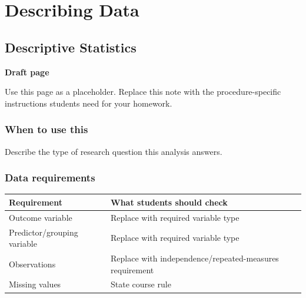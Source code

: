 \documentclass[
  letterpaper,
  DIV=11,
  numbers=noendperiod]{scrreprt}
\newcounter{none} %
\begin{document}
\part{Describing Data}

\chapter{Descriptive Statistics}\label{descriptive-statistics}

\begin{tcolorbox}[enhanced jigsaw, arc=.35mm, bottomrule=.15mm, breakable, colback=white, colframe=quarto-callout-note-color-frame, left=2mm, leftrule=.75mm, opacityback=0, rightrule=.15mm, toprule=.15mm]
\begin{minipage}[t]{5.5mm}
\textcolor{quarto-callout-note-color}{\faInfo}
\end{minipage}%
\begin{minipage}[t]{\textwidth - 5.5mm}

\vspace{-3mm}\textbf{Draft page}\vspace{3mm}

Use this page as a placeholder. Replace this note with the
procedure-specific instructions students need for your homework.

\end{minipage}%
\end{tcolorbox}

\section{When to use this}\label{when-to-use-this-3}

Describe the type of research question this analysis answers.

\section{Data requirements}\label{data-requirements-3}

{\def\LTcaptype{none} %
\begin{longtable}[]{@{}
  >{\raggedright\arraybackslash}p{}
  >{\raggedright\arraybackslash}p{}@{}}
\toprule\noalign{}
\begin{minipage}[b]{\linewidth}\raggedright
Requirement
\end{minipage} & \begin{minipage}[b]{\linewidth}\raggedright
What students should check
\end{minipage} \\
\midrule\noalign{}
\endhead
\bottomrule\noalign{}
\endlastfoot
Outcome variable & Replace with required variable type \\
Predictor/grouping variable & Replace with required variable type \\
Observations & Replace with independence/repeated-measures
requirement \\
Missing values & State course rule \\
\end{longtable}
}
\end{document}
